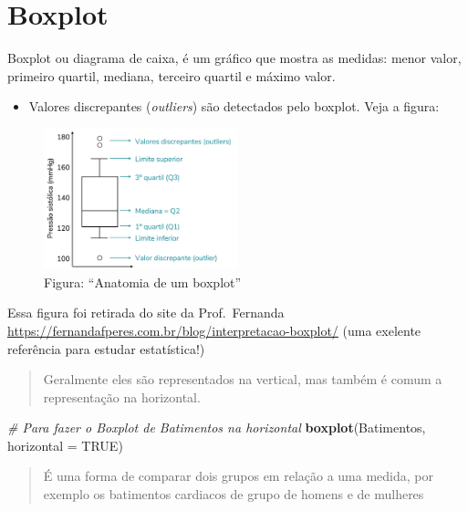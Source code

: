 \documentclass[
]{book}
\newenvironment{Shaded}{\begin{snugshade}}{\end{snugshade}}
\newcommand{\AttributeTok}[1]{\textcolor[rgb]{0.13,0.29,0.53}{#1}}
\newcommand{\CommentTok}[1]{\textcolor[rgb]{0.56,0.35,0.01}{\textit{#1}}}
\newcommand{\ConstantTok}[1]{\textcolor[rgb]{0.56,0.35,0.01}{#1}}
\newcommand{\FunctionTok}[1]{\textcolor[rgb]{0.13,0.29,0.53}{\textbf{#1}}}
\newcommand{\NormalTok}[1]{#1}
\providecommand{\tightlist}{%
  \setlength{\itemsep}{0pt}\setlength{\parskip}{0pt}}
\begin{document}
\section{Boxplot}\label{boxplot}

Boxplot ou diagrama de caixa, é um gráfico que mostra as medidas: menor valor, primeiro quartil, mediana, terceiro quartil e máximo valor.

\begin{itemize}
\tightlist
\item
  Valores discrepantes (\emph{outliers}) são detectados pelo boxplot. Veja a figura:
\end{itemize}

\begin{figure}
\centering
\includegraphics[width=0.5\textwidth,height=\textheight]{Boxplotexemplo.png}
\caption{Figura: ``Anatomia de um boxplot''}
\end{figure}

Essa figura foi retirada do site da Prof.~Fernanda \url{https://fernandafperes.com.br/blog/interpretacao-boxplot/} (uma exelente referência para estudar estatística!)

\begin{quote}
Geralmente eles são representados na vertical, mas também é comum a representação na horizontal.
\end{quote}

\begin{Shaded}
\begin{Highlighting}[]
\CommentTok{\# Para fazer o Boxplot de Batimentos na horizontal}
\FunctionTok{boxplot}\NormalTok{(Batimentos, }\AttributeTok{horizontal =} \ConstantTok{TRUE}\NormalTok{)}
\end{Highlighting}
\end{Shaded}

\begin{quote}
É uma forma de comparar dois grupos em relação a uma medida, por exemplo os batimentos cardiacos de grupo de homens e de mulheres
\end{quote}
\end{document}
